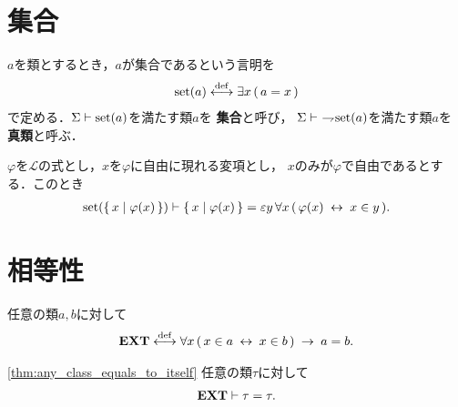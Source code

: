\section{集合}
	\begin{screen}
		\begin{dfn}[集合]
			$a$を類とするとき，$a$が集合であるという言明を
			\begin{align}
				\operatorname*{set} (a) \overset{\mathrm{def}}{\longleftrightarrow} \exists x\, (\, a = x\, )
			\end{align}
			で定める．$\Sigma \vdash \operatorname*{set} (a)$を満たす類$a$を
			{\bf 集合}と呼び，
			$\Sigma \vdash\ \rightharpoondown\hspace{-0.25em} \operatorname*{set} (a)$を満たす類$a$を
			{\bf 真類}と呼ぶ．
		\end{dfn}
	\end{screen}
	
	\begin{screen}
		\begin{thm}
			$\varphi$を$\mathcal{L}$の式とし，$x$を$\varphi$に自由に現れる変項とし，
			$x$のみが$\varphi$で自由であるとする．このとき
			\begin{align}
				\operatorname*{set} (\left\{\, x \mid \varphi(x)\, \right\}) \vdash \left\{\, x \mid \varphi(x)\, \right\} 
				= \varepsilon y\, \forall x\, (\, \varphi(x) \hspace{0.25em}\leftrightarrow\hspace{0.25em} x \in y\, ).
			\end{align}
		\end{thm}
	\end{screen}
	
\section{相等性}
	\begin{screen}
		\begin{axm}
			任意の類$a,b$に対して
			\begin{align}
				\mbox{{\bf EXT}} \overset{\mathrm{def}}{\longleftrightarrow} \forall x\, (\, x \in a \hspace{0.25em}\leftrightarrow\hspace{0.25em} x \in b\, ) 
				\hspace{0.25em}\rightarrow\hspace{0.25em} a=b.
			\end{align}
		\end{axm}
	\end{screen}
	
	\begin{screen}
		\begin{thm}[任意の類は自分自身と等しい]\ref{thm:any_class_equals_to_itself}
			任意の類$\tau$に対して
			\begin{align}
				\mbox{{\bf EXT}} \vdash \tau = \tau.
			\end{align}
		\end{thm}
	\end{screen}
	
